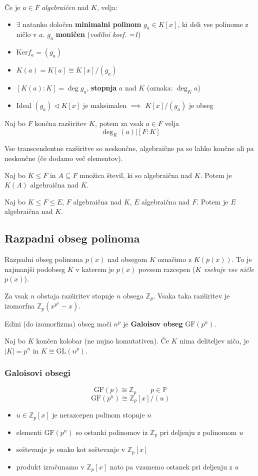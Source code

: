 Če je $a \in F$ \emph{algebraičen} nad $K$, velja:
\begin{itemize}
	\item $\exists$ natanko določen \textbf{minimalni polinom} $g_a \in K[x]$, ki deli vse polinome z ničlo v $a$.  $g_a$ \textbf{moničen} (\emph{vodilni koef. =1})
	\item $\text{Ker}f_a = (g_a)$
	\item $K(a) = K[a] \cong K[x] / (g_a)$
	\item $[K(a):K] = \deg g_a$, \textbf{stopnja} $a$ nad $K$ (oznaka: $\deg_K a$)
	\item Ideal $(g_a) \lhd K[x]$ je maksimalen $\implies$ $K[x] / (g_a)$ je obseg
\end{itemize}

Naj bo $F$ končna razširitev $K$, potem za vsak $a \in F$ velja 
\[\deg_K (a) \big| [F:K] \]

Vse transcendentne razširitve so neskončne, algebraične pa so lahko končne ali pa neskončne (če dodamo več elementov).

Naj bo $K \leq F$ in $A \subseteq F$ množica števil, ki so algebraična nad $K$. Potem je $K(A)$ algebraična nad $K$.

Naj bo $K \leq F \leq E$, $F$ algebraična nad $K$, $E$ algebraična nad $F$. Potem je $E$ algebraična nad $K$.

\subsection*{Razpadni obseg polinoma}
Razpadni obseg polinoma $p(x)$ nad obsegom $K$ označimo z $K(p(x))$. To je najmanjši podobseg $K$ v katerem je $p(x)$ povsem razcepen (\emph{$K$ vsebuje vse ničle $p(x)$}).

Za vsak $n$ obstaja razširitev stopnje $n$ obsega $\mathbb{Z}_p$. Vsaka taka razširitev je izomorfna $\mathbb{Z}_p (x^{p^n} - x)$.

Edini (do izomorfizma) obseg moči $n^p$ je \textbf{Galoisov obseg} $\text{GF}(p^n)$.

Naj bo $K$ končen kolobar (ne nujno komutativen). Če $K$ nima deliteljev niča, je $|K| = p^n$ in $K \cong \text{GL}(n^p)$.

\subsubsection*{Galoisovi obsegi}
\[\text{GF}(p) \cong \mathbb{Z}_p \qquad p \in \mathbb{P}\]
\[ \text{GF}(p^n) \cong \mathbb{Z}_p[x]/(u) \]
\begin{itemize}
	\item $u \in \mathbb{Z}_p[x]$ je nerazcepen polinom stopnje $n$
	\item elementi $\text{GF}(p^n)$ so ostanki polinomov iz $\mathbb{Z}_p$ pri deljenju z polinomom $u$
	\item seštevanje je enako kot seštevanje v $\mathbb{Z}_p[x]$
	\item produkt izračunamo v $\mathbb{Z}_p[x]$ nato pa vzamemo ostanek pri deljenju z $u$
\end{itemize}

